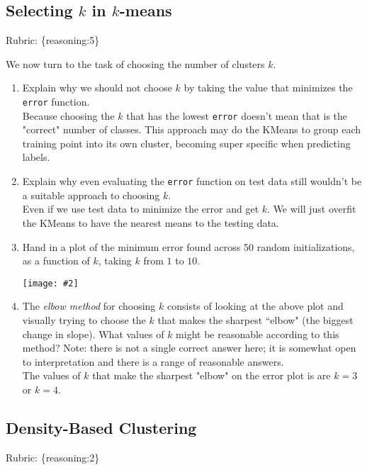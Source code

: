 \documentclass{article}
\def\rubric#1{\gre{Rubric: \{#1\}}}{}
\def\blu#1{{\color{blu}#1}}
\def\gre#1{{\color{gre}#1}}
\def\ans#1{{\color{ans}#1}}
\newcommand{\centerfig}[2]{\begin{center}\texttt{[image: \#2]}\end{center}}
\def\enum#1{\begin{enumerate}#1\end{enumerate}}
\begin{document}
 \subsection{Selecting $k$ in $k$-means}
\rubric{reasoning:5}

 We now turn to the task of choosing the number of clusters $k$.

 \blu{\enum{
 \item Explain why we should not choose $k$ by taking the value that minimizes the \texttt{error} function. \\
    \ans{
      Because choosing the $k$ that has the lowest \texttt{error} doesn't mean that is the "correct" number of classes. 
      This approach may do the KMeans to group each training point into its own cluster, becoming super 
      specific when predicting labels.
    }
 \item Explain why even evaluating the \texttt{error} function on test data still wouldn't be a suitable approach to choosing $k$. \\
    \ans{
      Even if we use test data to minimize the error and get $k$. We will just overfit the KMeans to have 
      the nearest means to the testing data.
    }
 \item Hand in a plot of the minimum error found across 50 random initializations, as a function of $k$, taking $k$ from $1$ to $10$. \\
    \ans{
      \centerfig{1}{../figs/q5_2_Kmeans_errors.pdf}
    }
 \item The \emph{elbow method} for choosing $k$ consists of looking at the above plot and visually trying to choose the $k$ that makes the sharpest ``elbow" (the biggest change in slope). What values of $k$ might be reasonable according to this method? Note: there is not a single correct answer here; it is somewhat open to interpretation and there is a range of reasonable answers. \\
    \ans{
      The values of $k$ that make the sharpest "elbow" on the error plot is are $k=3$ or $k=4$.
    }
 }}

\subsection{Density-Based Clustering}
\rubric{reasoning:2}
\end{document}
